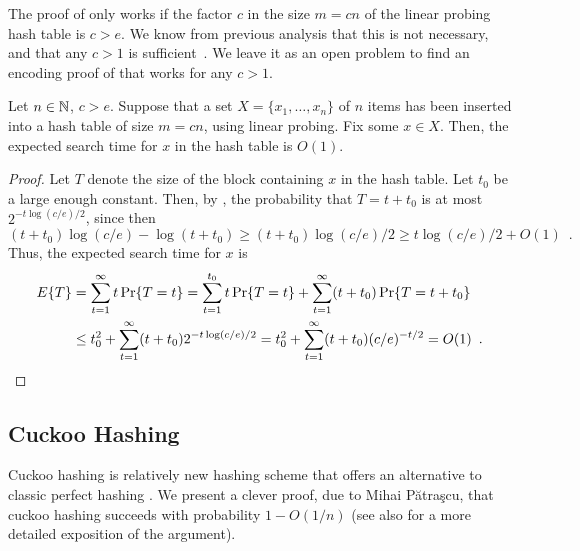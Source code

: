 \documentclass{patmorin}
\begin{document}
\begin{rem}
  The proof of  only works if the factor
  $c$ in the size $m = cn$ of the linear probing hash table is 
  $c > e$.
  We know from
  previous analysis that this is not necessary, and that any $c>1$ is
  sufficient~\cite[Theorem~9.8]{flajolet.sedgewick:aofa}. 
  We leave it as an open problem to find an encoding proof
  of  that works for any $c>1$.
\end{rem}

\begin{cor}
  Let $n \in \mathbb{N}$, $c > e$.
  Suppose that a set $X = \{x_1, \dots, x_n\}$ of $n$ items 
  has been inserted into a hash table of size $m = cn$, using linear 
  probing.
  Fix some $x\in X$. 
  Then, the expected search time for $x$ in the hash table is
  $O(1)$.
\end{cor}
\begin{proof}
  Let $T$ denote the size of the block containing $x$ in the
  hash table. Let $t_0$ be a large enough constant. 
  Then, by , the probability
  that $T = t + t_0$ is at most $2^{-t\log(c/e)/2}$,
  since then
  \[(t  + t_0)\log(c/e) - \log(t+t_0)
  \geq
(t  + t_0)\log(c/e)/2
    \geq t\log(c/e)/2 + O(1) \enspace. 
    \]
  Thus, the expected search time for $x$ is
  \begin{align*}
   E\{T\} &= \sum_{t = 1}^\infty t\Pr\{T = t\} = \sum_{t=1}^{t_0} t\Pr\{T = t\} + \sum_{t = 1}^\infty (t+t_0)\Pr\{T = t + t_0\} \\
            &\le t_0^2 + \sum_{t = 1}^\infty (t+t_0)2^{-t \log (c/e)/2} = t_0^2 + \sum_{t = 1}^\infty (t+t_0)(c/e)^{-t/2} = O(1) \enspace . \qedhere
  \end{align*}
\end{proof}

\subsection{Cuckoo Hashing}

Cuckoo hashing is relatively new hashing scheme that offers an
alternative to classic perfect hashing \cite{pagh.rodler:cuckoo}. 
We present a clever proof, due to Mihai Pătraşcu, that cuckoo hashing
succeeds with probability $1-O(1/n)$ \cite{patrascu:cuckoo}
(see also \cite{haimberger:cuckoo} for a more detailed exposition of the 
argument).
\end{document}
